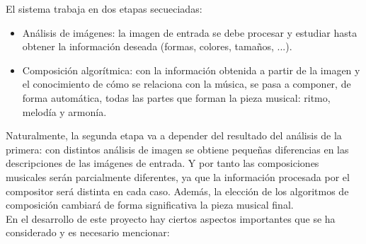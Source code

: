 		El sistema trabaja en dos etapas secueciadas:
		
		\begin{itemize}
		
		\item Análisis de imágenes: la imagen de entrada se debe procesar y estudiar hasta obtener la información deseada (formas, colores, tamaños, ...).

		\item Composición algorítmica: con la información obtenida a partir de la imagen y el conocimiento de cómo se relaciona con la música, se pasa a componer, de forma automática, todas las partes que forman la pieza musical: ritmo, melodía y armonía.
		\end{itemize}
		
		Naturalmente, la segunda etapa va a depender del resultado del análisis de la primera: con distintos análisis de imagen se obtiene pequeñas diferencias en las descripciones de las imágenes de entrada. Y por tanto las composiciones musicales serán parcialmente diferentes, ya que la información procesada por el compositor será distinta en cada caso. Además, la elección de los algoritmos de composición cambiará de forma significativa la pieza musical final.\\
		
		En el desarrollo de este proyecto hay ciertos aspectos importantes que se ha considerado y es necesario mencionar:	

